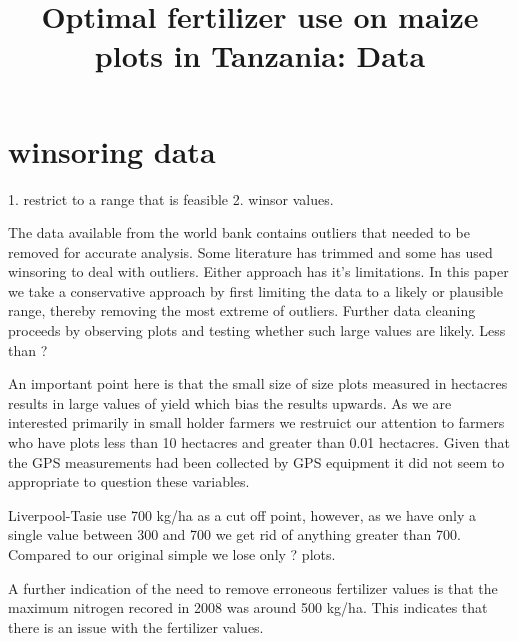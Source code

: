 \documentclass{article}
\begin{document}
\title{Optimal fertilizer use on maize plots in Tanzania: Data}
\maketitle

\section{winsoring data}

1. restrict to a range that is feasible
2. winsor values.

The data available from the world bank contains outliers that needed to be removed for accurate analysis. Some literature has trimmed and some has used winsoring to deal with outliers. Either approach has it's limitations. In this paper we take a conservative approach by first limiting the data to a likely or plausible range, thereby removing the most extreme of outliers. Further data cleaning proceeds by observing plots and testing whether such large values are likely. Less than ?%

An important point here is that the small size of size plots measured in hectacres results in large values of yield which bias the results upwards. As we are interested primarily in small holder farmers we restruict our attention to farmers who have plots less than 10 hectacres and greater than 0.01 hectacres. Given that the GPS measurements had been collected by GPS equipment it did not seem to appropriate to question these variables.

Liverpool-Tasie use 700 kg/ha as a cut off point, however, as we have only a single value between 300 and 700 we get rid of anything greater than 700. Compared to our original simple we lose only ? plots. 

A further indication of the need to remove erroneous fertilizer values is that the maximum nitrogen recored in 2008 was around 500 kg/ha. This indicates that there is an issue with the fertilizer values.
\end{document}
